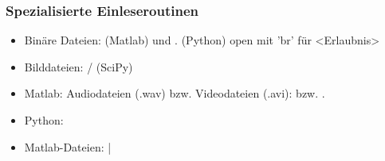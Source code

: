 \documentclass[hyperref={xetex}]{beamer}
\begin{document}
%
%
\begin{frame}[fragile]\frametitle{Spezialisierte Einleseroutinen}
\begin{itemize}
\item Binäre Dateien: (Matlab) \alert{} und \alert{}. (Python) open mit 'br' für <Erlaubnis>
\item Bilddateien: \alert{/} (SciPy)
\item Matlab: Audiodateien (.wav) bzw. Videodateien (.avi):
\alert{} bzw. \alert{}. 
\item Python: 
 \item Matlab-Dateien:  |  
\end{itemize}
\end{frame}
%
%
%
%
%
%
\end{document}
